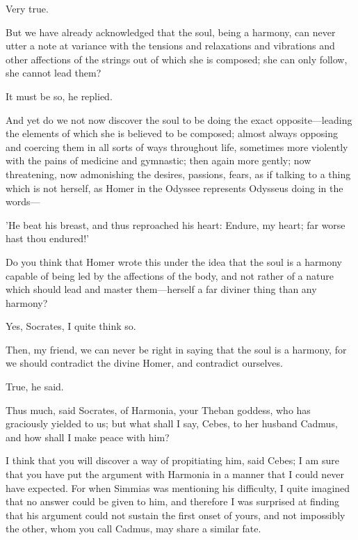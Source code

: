 \documentclass[11pt,letter]{article}
\begin{document}
\par  Very true.

\par  But we have already acknowledged that the soul, being a harmony, can never utter a note at variance with the tensions and relaxations and vibrations and other affections of the strings out of which she is composed; she can only follow, she cannot lead them?

\par  It must be so, he replied.

\par  And yet do we not now discover the soul to be doing the exact opposite—leading the elements of which she is believed to be composed; almost always opposing and coercing them in all sorts of ways throughout life, sometimes more violently with the pains of medicine and gymnastic; then again more gently; now threatening, now admonishing the desires, passions, fears, as if talking to a thing which is not herself, as Homer in the Odyssee represents Odysseus doing in the words—

\par  'He beat his breast, and thus reproached his heart: Endure, my heart; far worse hast thou endured!'

\par  Do you think that Homer wrote this under the idea that the soul is a harmony capable of being led by the affections of the body, and not rather of a nature which should lead and master them—herself a far diviner thing than any harmony?

\par  Yes, Socrates, I quite think so.

\par  Then, my friend, we can never be right in saying that the soul is a harmony, for we should contradict the divine Homer, and contradict ourselves.

\par  True, he said.

\par  Thus much, said Socrates, of Harmonia, your Theban goddess, who has graciously yielded to us; but what shall I say, Cebes, to her husband Cadmus, and how shall I make peace with him?

\par  I think that you will discover a way of propitiating him, said Cebes; I am sure that you have put the argument with Harmonia in a manner that I could never have expected. For when Simmias was mentioning his difficulty, I quite imagined that no answer could be given to him, and therefore I was surprised at finding that his argument could not sustain the first onset of yours, and not impossibly the other, whom you call Cadmus, may share a similar fate.
\end{document}
